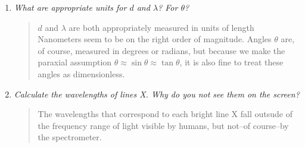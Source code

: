 \documentclass[11.8pt]{amsart}
\begin{document}
\begin{enumerate}
\item {\textit{What are appropriate units for $d$ and $\lambda$? For $\theta$?}

\begin{quote}
$d$ and $\lambda$ are both appropriately measured in units of length Nanometers seem to be on the right order of magnitude. Angles $\theta$ are, of course, measured in degrees or radians, but because we make the paraxial assumption $\theta\approx\sin\theta\approx\tan\theta$, it is also fine to treat these angles as dimensionless.\end{quote}}
\item{\textit{Calculate the wavelengths of lines X. Why do you not see them on the screen?}
\begin{quote}
The wavelengths that correspond to each bright line X fall outsude of the frequency range of light visible by humans, but not--of course--by the spectrometer.
\end{quote}}
\end{enumerate}
\vfill\newpage
\end{document}

